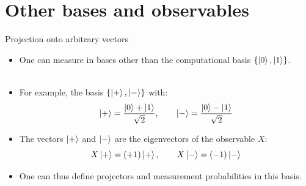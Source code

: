 \documentclass[aspectratio=169,12pt]{beamer}
\begin{document}
\section{Other bases and observables}

\begin{frame}{Projection onto arbitrary vectors}
  \begin{itemize}[<+->]
    \setlength{\itemsep}{0.8em}
    \item One can measure in bases other than the computational basis $\{\ket{0}, \ket{1}\}$.\\~\\
    \item For example, the basis $\{\ket{+}, \ket{-}\}$ with:
    $$\ket{+} = \frac{\ket{0}+\ket{1}}{\sqrt{2}}, \qquad \ket{-} = \frac{\ket{0}-\ket{1}}{\sqrt{2}}$$
    \item The vectors $\ket{+}$ and $\ket{-}$ are the eigenvectors of the observable $X$:
    $$X\ket{+} = (+1)\ket{+}, \qquad X\ket{-} = (-1)\ket{-}$$
    \item One can thus define projectors and measurement probabilities in this basis.
  \end{itemize}
\end{frame}
\end{document}
